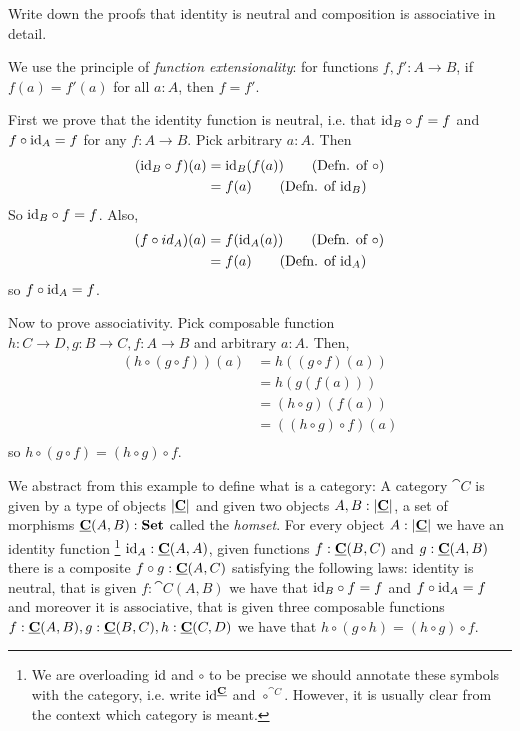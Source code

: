 \begin{Exercise}
  Write down the proofs that identity is neutral and composition is associative in detail.
\end{Exercise}
\begin{Answer}
  We use the principle of \emph{function extensionality}: for functions $f,f':A\to B$, if $f(a)=f'(a)$ for all $a:A$, then $f=f'$.

  First we prove that the identity function is neutral, i.e. that $\mathrm{id}_B\circ f=f$ and $f\circ\mathrm{id}_A=f$ for any $f\colon A\to B$. Pick arbitrary $a:A$. Then
  \begin{align*}
    (\id_B \circ f)(a) 
      &= \id_B(f(a)) \tag{Defn. of $\circ$}\\
      &= f(a) \tag{Defn. of $\id_B$} 
  \end{align*}
  So $\mathrm{id}_B\circ f = f$. Also,
  \begin{align*}
    (f\circ id_A)(a) 
      &= f(\id_A(a)) \tag{Defn. of $\circ$}\\
      &= f(a) \tag{Defn. of $\id_A$} 
  \end{align*}
  so $f\circ\mathrm{id}_A = f$.

  Now to prove associativity. Pick composable function $h : C \to D, g : B \to C, f : A \to B$ and arbitrary $a:A$. Then,
  \begin{align*}
    (h \circ (g \circ f))(a)
      &= h((g\circ f)(a)) \tag{Defn. $\circ$}\\
      &= h(g(f(a))) \tag{Defn. $\circ$}\\
      &= (h\circ g)(f(a)) \tag{Defn. $\circ$}\\
      &= ((h\circ g)\circ f)(a) \tag{Defn. $\circ$}\\
  \end{align*}
  so $h \circ (g \circ f) = (h \circ g) \circ f$.
\end{Answer}

We abstract from this example to define what is a category: A category $\cat{C}$ is given by a type of objects $|\underline{\mathbf{C}}|$ and given two objects $A,B: |\underline{\mathbf{C}}|$, a set of morphisms $\underline{\mathbf{C}}(A,B) : \mathbf{Set}$ called the \emph{homset}. 
For every object $A : |\underline{\mathbf{C}}|$ we have an identity function%
\footnote{We are overloading $\mathrm{id}$ and $\circ$ to be precise we should annotate these symbols with the category, i.e. write $\mathrm{id}^{\underline{\mathbf{C}}}$ and $\circ^{\cat{C}}$. However, it is usually clear from the context which category is meant.}
$\mathrm{id}_A : \underline{\mathbf{C}}(A,A)$, given functions $f : \underline{\mathbf{C}}(B,C)$ and $g : \underline{\mathbf{C}}(A,B)$ there is a composite $f \circ g : \underline{\mathbf{C}}(A,C)$ satisfying the following laws: identity is neutral, that is given $f : \cat{C}(A,B)$ we have that $\mathrm{id}_B \circ f = f$ and $f \circ \mathrm{id}_A = f$ and moreover it is associative, that is given three composable functions $f : \underline{\mathbf{C}}(A,B), g : \underline{\mathbf{C}}(B,C), h : \underline{\mathbf{C}}(C,D)$ we have that $h \circ (g \circ h) = (h \circ g) \circ f$.

